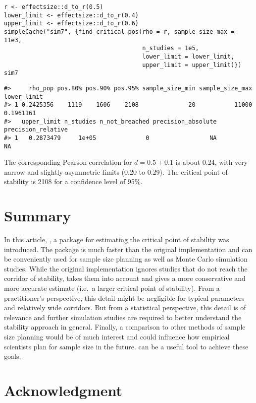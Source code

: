 \begin{verbatim}
r <- effectsize::d_to_r(0.5)
lower_limit <- effectsize::d_to_r(0.4)
upper_limit <- effectsize::d_to_r(0.6)
simpleCache("sim7", {find_critical_pos(rho = r, sample_size_max = 11e3,
                                       n_studies = 1e5,
                                       lower_limit = lower_limit,
                                       upper_limit = upper_limit)})
sim7
\end{verbatim}

\begin{verbatim}
#>     rho_pop pos.80% pos.90% pos.95% sample_size_min sample_size_max lower_limit
#> 1 0.2425356    1119    1606    2108              20           11000   0.1961161
#>   upper_limit n_studies n_not_breached precision_absolute precision_relative
#> 1   0.2873479     1e+05              0                 NA                 NA
\end{verbatim}

The corresponding Pearson correlation for \(d=0.5\pm0.1\) is about 0.24, with very narrow and slightly asymmetric limits (0.20 to 0.29). The critical point of stability is 2108 for a confidence level of 95\%.

\hypertarget{summary}{%
\section{Summary}\label{summary}}

In this article, , a package for estimating the critical point of stability was introduced. The package is much faster than the original implementation and can be conveniently used for sample size planning as well as Monte Carlo simulation studies. While the original implementation ignores studies that do not reach the corridor of stability,  takes them into account and gives a more conservative and more accurate estimate (i.e.~a larger critical point of stability). From a practitioner's perspective, this detail might be negligible for typical parameters and relatively wide corridors. But from a statistical perspective, this detail is of relevance and further simulation studies are required to better understand the stability approach in general. Finally, a comparison to other methods of sample size planning would be of much interest and could influence how empirical scientists plan for sample size in the future.  can be a useful tool to achieve these goals.

\hypertarget{acknowledgment}{%
\section{Acknowledgment}\label{acknowledgment}}

